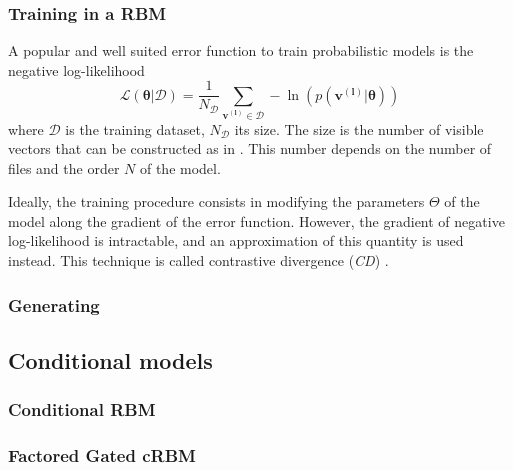 \documentclass{article}
\begin{document}
\subsubsection{Training in a RBM}
A popular and well suited error function to train probabilistic models is the negative log-likelihood 
\begin{equation}
\label{eq:likelihood}
\mathcal{L(\bm{\theta}|\mathcal{D})}  = \frac{1}{N_{\mathcal{D}}} \sum_{\bm{v^{(l)}} \in \mathcal{D}} - \ln \left( p(\bm{v^{(l)}}|\bm{\theta})\right)
\end{equation}
where $\mathcal{D}$ is the training dataset, $N_{\mathcal{D}}$ its size. The size is the number of visible vectors that can be constructed as in . This number depends on the number of files and the order $N$ of the model.

Ideally, the training procedure consists in modifying the parameters $\Theta$ of the model along the gradient of the error function.
However, the gradient of negative log-likelihood is intractable,
and an approximation of this quantity is used instead. This technique is called contrastive divergence (\textit{CD}) \cite{fischer2012introduction,hinton2010practical}.
\subsubsection{Generating}

\subsection{Conditional models}
\subsubsection{Conditional RBM}
\subsubsection{Factored Gated cRBM}
\end{document}
